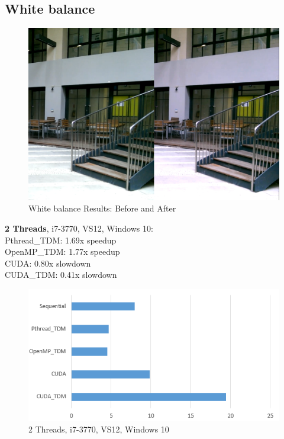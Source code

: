 \documentclass{acm_proc_article-sp}
\begin{document}
\subsection{White balance}
\begin{figure}[H]
  \includegraphics[width=\linewidth,natwidth=1230,natheight=844]{whitebalance_comparison.png}
  \caption{White balance Results: Before and After}
  \label{fig:whitebalance_comparison}
\end{figure}
\textbf{2 Threads}, i7-3770, VS12, Windows 10: \\
Pthread\_TDM: 1.69x speedup \\
OpenMP\_TDM: 1.77x speedup \\
CUDA: 0.80x slowdown \\
CUDA\_TDM: 0.41x slowdown
\begin{figure}[H]
  \includegraphics[width=\linewidth,natwidth=569,natheight=299]{white2.png}
  \caption{2 Threads, i7-3770, VS12, Windows 10}
  \label{fig:white2}
\end{figure}
\end{document}
